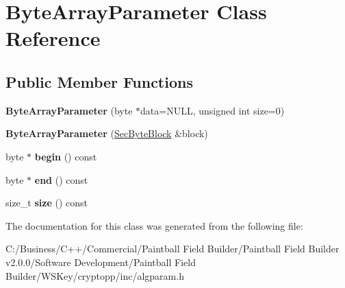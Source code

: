 \hypertarget{class_byte_array_parameter}{
\section{ByteArrayParameter Class Reference}
\label{class_byte_array_parameter}
}
\subsection*{Public Member Functions}
\begin{DoxyCompactItemize}
\item 
\hypertarget{class_byte_array_parameter_aea37efc6d68f01b66e417e73e0de332f}{
{\bfseries ByteArrayParameter} (byte $\ast$data=NULL, unsigned int size=0)}
\label{class_byte_array_parameter_aea37efc6d68f01b66e417e73e0de332f}

\item 
\hypertarget{class_byte_array_parameter_a7900b4c0cf08814c23fed3cc320483d7}{
{\bfseries ByteArrayParameter} (\hyperlink{class_sec_block}{SecByteBlock} \&block)}
\label{class_byte_array_parameter_a7900b4c0cf08814c23fed3cc320483d7}

\item 
\hypertarget{class_byte_array_parameter_aa6ad5851432dad80ee27d78474cc2c80}{
byte $\ast$ {\bfseries begin} () const }
\label{class_byte_array_parameter_aa6ad5851432dad80ee27d78474cc2c80}

\item 
\hypertarget{class_byte_array_parameter_afe9cd72cc9901144416b52e5b0820bf8}{
byte $\ast$ {\bfseries end} () const }
\label{class_byte_array_parameter_afe9cd72cc9901144416b52e5b0820bf8}

\item 
\hypertarget{class_byte_array_parameter_a33e0d509b5621e68d9599409b7b9863c}{
size\_\-t {\bfseries size} () const }
\label{class_byte_array_parameter_a33e0d509b5621e68d9599409b7b9863c}

\end{DoxyCompactItemize}


The documentation for this class was generated from the following file:\begin{DoxyCompactItemize}
\item 
C:/Business/C++/Commercial/Paintball Field Builder/Paintball Field Builder v2.0.0/Software Development/Paintball Field Builder/WSKey/cryptopp/inc/algparam.h\end{DoxyCompactItemize}

